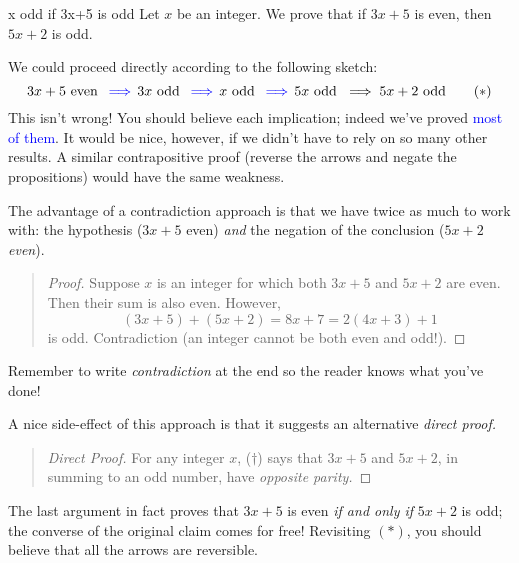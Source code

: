 \begin{example}{}{x odd if 3x+5 is odd}
	Let $x$ be an integer. We prove that if $3x+5$ is even, then $5x+2$ is odd.\medbreak

	We could proceed directly according to the following sketch:
	\[
		3x+5\text{ even }\operatorname{\textcolor{blue}{\implies}} 3x\text{ odd }\operatorname{\textcolor{blue}{\implies}} x\text{ odd }\operatorname{\textcolor{blue}{\implies}} 5x\text{ odd }\implies 5x+2\text{ odd} \tag{$\ast$}
	\]
	This isn't wrong! You should believe each implication; indeed we've proved \textcolor{blue}{most of them}. It would be nice, however, if we didn't have to rely on so many other results. A similar contrapositive proof (reverse the arrows and negate the propositions) would have the same weakness.\medbreak
	
	The advantage of a contradiction approach is that we have twice as much to work with: the hypothesis ($3x+5$ even) \emph{and} the negation of the conclusion ($5x+2$ \emph{even}).
	
	\begin{quote}
		\begin{proof}
			Suppose $x$ is an integer for which both $3x+5$ and $5x+2$ are even. Then their sum is also even. However,
		  \[
		  	(3x+5)+(5x+2)=8x+7=2(4x+3)+1 \tag{$\dag$}
		  \]
		  is odd. Contradiction (an integer cannot be both even and odd!).
		\end{proof}
	\end{quote}
	
	Remember to write \emph{contradiction} at the end so the reader knows what you've done!\smallbreak
	
	A nice side-effect of this approach is that it suggests an alternative \emph{direct proof.}
	
	\begin{quote}
		\begin{proof}[Direct Proof]
			For any integer $x$, ($\dag$) says that $3x+5$ and $5x+2$, in summing to an odd number, have \emph{opposite parity.}
		\end{proof}
	\end{quote}
	
	The last argument in fact proves that $3x+5$ is even \emph{if and only if} $5x+2$ is odd; the converse of the original claim comes for free! Revisiting $(\ast)$, you should believe that all the arrows are reversible.
\end{example}


\goodbreak



